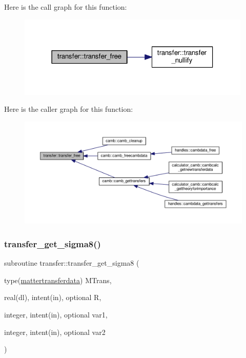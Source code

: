 Here is the call graph for this function\+:
\nopagebreak
\begin{figure}[H]
\begin{center}
\leavevmode
\includegraphics[width=316pt]{namespacetransfer_a34407967277591afeb26880a4f0926dc_cgraph}
\end{center}
\end{figure}
Here is the caller graph for this function\+:
\nopagebreak
\begin{figure}[H]
\begin{center}
\leavevmode
\includegraphics[width=350pt]{namespacetransfer_a34407967277591afeb26880a4f0926dc_icgraph}
\end{center}
\end{figure}
\mbox{\label{namespacetransfer_a6330289a440bd51a5c55da9c40dee8a2}} 
\subsubsection{\texorpdfstring{transfer\+\_\+get\+\_\+sigma8()}{transfer\_get\_sigma8()}}
{\footnotesize\ttfamily subroutine transfer\+::transfer\+\_\+get\+\_\+sigma8 (\begin{DoxyParamCaption}\item[{type(\mbox{\hyperlink{structtransfer_1_1mattertransferdata}{mattertransferdata}})}]{M\+Trans,  }\item[{real(dl), intent(in), optional}]{R,  }\item[{integer, intent(in), optional}]{var1,  }\item[{integer, intent(in), optional}]{var2 }\end{DoxyParamCaption})}




